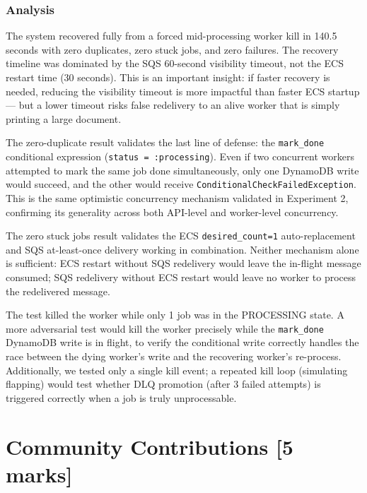\documentclass[11pt,letterpaper]{article}
\newcommand{\code}[1]{\texttt{\small #1}}
\begin{document}
\subsubsection{Analysis}

\begin{resultbox}
The system recovered fully from a forced mid-processing worker kill in 140.5 seconds with zero duplicates, zero stuck jobs, and zero failures. The recovery timeline was dominated by the SQS 60-second visibility timeout, not the ECS restart time (30 seconds). This is an important insight: if faster recovery is needed, reducing the visibility timeout is more impactful than faster ECS startup --- but a lower timeout risks false redelivery to an alive worker that is simply printing a large document.

The zero-duplicate result validates the last line of defense: the \code{mark\_done} conditional expression (\code{status = :processing}). Even if two concurrent workers attempted to mark the same job done simultaneously, only one DynamoDB write would succeed, and the other would receive \code{ConditionalCheckFailedException}. This is the same optimistic concurrency mechanism validated in Experiment 2, confirming its generality across both API-level and worker-level concurrency.

The zero stuck jobs result validates the ECS \code{desired\_count=1} auto-replacement and SQS at-least-once delivery working in combination. Neither mechanism alone is sufficient: ECS restart without SQS redelivery would leave the in-flight message consumed; SQS redelivery without ECS restart would leave no worker to process the redelivered message.
\end{resultbox}

\begin{limitbox}
The test killed the worker while only 1 job was in the PROCESSING state. A more adversarial test would kill the worker precisely while the \code{mark\_done} DynamoDB write is in flight, to verify the conditional write correctly handles the race between the dying worker's write and the recovering worker's re-process. Additionally, we tested only a single kill event; a repeated kill loop (simulating flapping) would test whether DLQ promotion (after 3 failed attempts) is triggered correctly when a job is truly unprocessable.
\end{limitbox}


\section{Community Contributions [5 marks]}
\label{sec:community}
\end{document}
